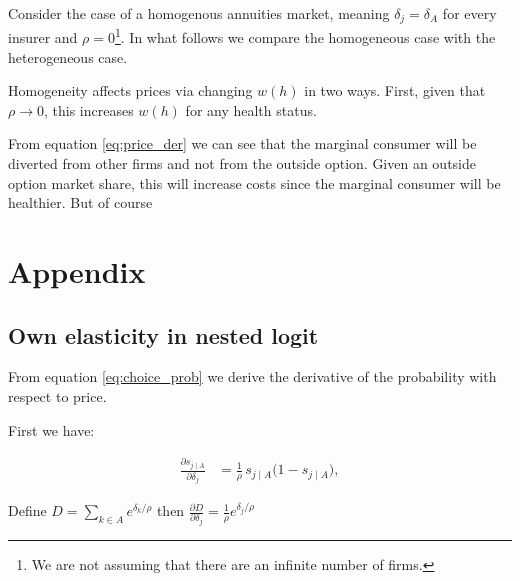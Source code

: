 \documentclass[12pt]{article}
\theoremstyle{plain}
\theoremstyle{plain}
\begin{document}
Consider the case of a homogenous  annuities market, meaning $\delta_j = \delta_A$ for every insurer and $\rho = 0$\footnote{We are not assuming that there are an infinite number of firms.}.
In what follows we compare the homogeneous case with the heterogeneous case. 

Homogeneity affects prices via changing $w(h)$ in two ways. First, given that $\rho \rightarrow 0$, this increases $w(h)$ for any health status. 



From equation \ref{eq:price_der} we can see that the marginal consumer will be diverted from other firms and not from the outside option. 
Given an outside option market share, this will increase costs since the marginal consumer will be healthier.  But of course 


 
\section{Appendix}

\subsection{Own elasticity in nested logit}\label{sec:appendix1}
From equation \ref{eq:choice_prob} we derive the derivative of the probability with respect to price. 

First we have: 

\begin{align}\label{eq:a1}
\frac{\partial s_{j\mid A}}{\partial \delta_j}
&=\frac{1}{\rho}\,s_{j\mid A}\big(1 - s_{j\mid A}\big), 
\end{align}

Define $D= \sum_{k\in A} e^{\delta_k/\rho}$ then $\frac{\partial D}{\partial \delta_j} =\frac{1}{\rho} e^{\delta_j/\rho} $
\end{document}
